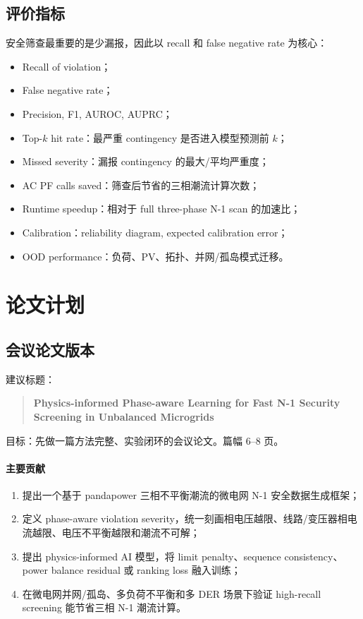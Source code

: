 \documentclass[UTF8,11pt]{ctexart}
\begin{document}
\subsection{评价指标}

安全筛查最重要的是少漏报，因此以 recall 和 false negative rate 为核心：

\begin{itemize}
    \item Recall of violation；
    \item False negative rate；
    \item Precision, F1, AUROC, AUPRC；
    \item Top-$k$ hit rate：最严重 contingency 是否进入模型预测前 $k$；
    \item Missed severity：漏报 contingency 的最大/平均严重度；
    \item AC PF calls saved：筛查后节省的三相潮流计算次数；
    \item Runtime speedup：相对于 full three-phase N-1 scan 的加速比；
    \item Calibration：reliability diagram, expected calibration error；
    \item OOD performance：负荷、PV、拓扑、并网/孤岛模式迁移。
\end{itemize}

\section{论文计划}

\subsection{会议论文版本}

建议标题：

\begin{quote}
\textbf{Physics-informed Phase-aware Learning for Fast N-1 Security Screening in Unbalanced Microgrids}
\end{quote}

目标：先做一篇方法完整、实验闭环的会议论文。篇幅 6--8 页。

\paragraph{主要贡献}
\begin{enumerate}
    \item 提出一个基于 pandapower 三相不平衡潮流的微电网 N-1 安全数据生成框架；
    \item 定义 phase-aware violation severity，统一刻画相电压越限、线路/变压器相电流越限、电压不平衡越限和潮流不可解；
    \item 提出 physics-informed AI 模型，将 limit penalty、sequence consistency、power balance residual 或 ranking loss 融入训练；
    \item 在微电网并网/孤岛、多负荷不平衡和多 DER 场景下验证 high-recall screening 能节省三相 N-1 潮流计算。
\end{enumerate}
\end{document}
